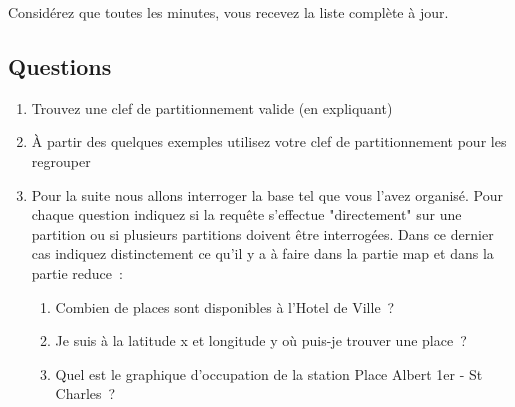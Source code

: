 \documentclass[11pt,letterpaper]{article}
\begin{document}
Considérez que toutes les minutes, vous recevez la liste complète à jour.

\subsection*{Questions}

\begin{enumerate}
\item Trouvez une clef de partitionnement valide (en expliquant)
\item À partir des quelques exemples utilisez votre clef de partitionnement pour les regrouper
\item Pour la suite nous allons interroger la base tel que vous l'avez organisé.
 Pour chaque question indiquez si la requête s'effectue "directement" sur une partition ou
 si plusieurs partitions doivent être interrogées. Dans ce dernier cas indiquez distinctement
 ce qu'il y a à faire dans la partie map et dans la partie reduce~:
    \begin{enumerate}
	\item Combien de places sont disponibles à l'Hotel de Ville~?
	\item Je suis à la latitude x et longitude y où puis-je trouver une place~?
	\item Quel est le graphique d'occupation de la station Place Albert 1er - St Charles~?
    \end{enumerate}
\end{enumerate}
\end{document}
